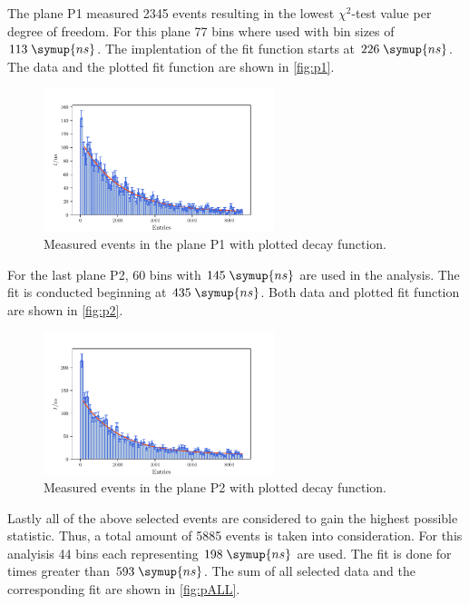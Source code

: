 The plane P1 measured 2345 events resulting in the lowest $\chi^2$-test value per degree of freedom.
For this plane 77 bins where used with bin sizes of $113 \; \symup{ns}$. The implentation of 
the fit function starts at $226 \; \symup{ns}$. The data and the plotted fit function are shown in \autoref{fig:p1}.\\

\begin{figure}
    \centering
    \includegraphics[width=0.6\textwidth]{plots/p1.pdf}
    \caption{Measured events in the plane P1 with plotted decay function.}
    \label{fig:p1}
\end{figure}

For the last plane P2, 60 bins with $145\;\symup{ns}$ are used in the analysis. The fit is conducted 
beginning at $435\;\symup{ns}$. Both data and plotted fit function are shown in \autoref{fig:p2}.\\

\begin{figure}
    \centering
    \includegraphics[width=0.6\textwidth]{plots/p2.pdf}
    \caption{Measured events in the plane P2 with plotted decay function.}
    \label{fig:p2}
\end{figure}

Lastly all of the above selected events are considered to gain the highest possible statistic.
Thus, a total amount of 5885 events is taken into consideration. For this analyisis 44 bins each 
representing $198\;\symup{ns}$ are used. The fit is done for times greater than $593\;\symup{ns}$.
The sum of all selected data and the corresponding fit are shown in \autoref{fig:pALL}.

